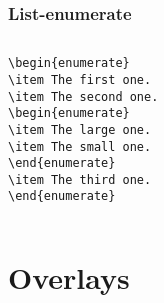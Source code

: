 \documentclass[article]{beamer}
\begin{document}
\begin{frame}[fragile]
\frametitle{List-enumerate}

\begin{columns}
\begin{block}
\scriptsize{
\begin{verbatim}
\begin{enumerate}
\item The first one.
\item The second one.
\begin{enumerate}
\item The large one.
\item The small one.
\end{enumerate}
\item The third one.
\end{enumerate}
\end{verbatim}
}
\end{block}
\end{columns}


\end{frame}


\section{Overlays}
\end{document}
